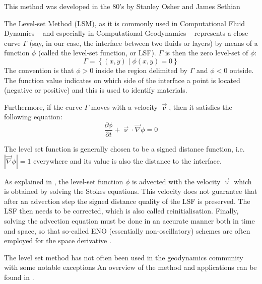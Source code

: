 This method was developed in the 80's by Stanley Osher and James Sethian \cite{lofo06}

The Level-set Method (LSM), as it is commonly used in Computational Fluid Dynamics -- and especially 
in Computational Geodynamics -- represents a close curve $\Gamma$ (say, in our case, the 
interface between two fluids or layers) by means of a function $\phi$ (called the level-set function, or LSF).
$\Gamma$ is then the zero level-set of $\phi$:
\begin{equation}
\Gamma = \left\{ (x,y) \; |\; \phi(x,y)=0 \right\}
\end{equation}
The convention is that $\phi>0$ inside the region delimited by $\Gamma$ and $\phi<0$ outside.
The function value indicates on which side of the
interface a point is located (negative or positive) and this is
used to identify materials. 

Furthermore, if the curve $\Gamma$ moves with a velocity $\vec \upnu$, 
then it satisfies the following equation:
\begin{equation}
\frac{\partial \phi}{\partial t} + \vec\upnu \cdot \vec\nabla \phi = 0 
\end{equation}

The level set function is generally chosen to
be a signed distance function, i.e. $|\vec\nabla \phi| = 1$ everywhere 
and its value is also the distance to the interface.

As explained in \cite{hitg14}, the level-set function $\phi$ is advected 
with the velocity $\vec\upnu$ which is obtained by solving the Stokes equations.
This velocity does not guarantee that after an advection step the signed 
distance quality of the LSF is preserved. 
The LSF then needs to be corrected, which is also called reinitialisation. 
Finally, solving the advection equation must be done in an accurate manner both in time and space,
so that so-called ENO (essentially non-oscillatory) schemes are often employed for the 
space derivative \cite{ossh91,saev10}.


The level set method has not often been used in the geodynamics 
community with some notable exceptions 
\cite{bomh06,bomh07,habm07,grbh07,zlfd08,hagr10,sunh10,suhe10,hitg14}
An overview of the method and applications can
be found in \cite{osfe01}.

